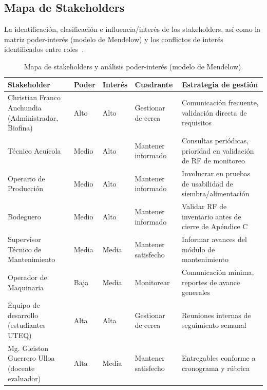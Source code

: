 \documentclass[11pt,a4paper]{article}
\begin{document}
\subsection{Mapa de Stakeholders}
La identificación, clasificación e influencia/interés de los stakeholders, así como la matriz poder-interés (modelo de Mendelow) y los conflictos de interés identificados entre roles~\cite{stakeholder_elicitation_2021}.

\begin{longtable}{|p{4cm}|p{1cm}|p{1.5cm}|p{3cm}|p{5cm}|}
\caption{Mapa de stakeholders y análisis poder-interés (modelo de Mendelow).}
\label{tab:mapa-stakeholders} \\
\hline
\textbf{Stakeholder} & \textbf{Poder} & \textbf{Interés} & \textbf{Cuadrante} & \textbf{Estrategia de gestión} \\
\hline
Christian Franco Anchundia (Administrador, Biofina) & Alto & Alto & Gestionar de cerca & Comunicación frecuente, validación directa de requisitos \\
\hline
Técnico Acuícola & Medio & Alto & Mantener informado & Consultas periódicas, prioridad en validación de RF de monitoreo \\
\hline
Operario de Producción & Medio & Alto & Mantener informado & Involucrar en pruebas de usabilidad de siembra/alimentación \\
\hline
Bodeguero & Medio & Alto & Mantener informado & Validar RF de inventario antes de cierre de Apéndice C \\
\hline
Supervisor Técnico de Mantenimiento & Media & Media & Mantener satisfecho & Informar avances del módulo de mantenimiento \\
\hline
Operador de Maquinaria & Baja & Media & Monitorear & Comunicación mínima, reportes de avance generales \\
\hline
Equipo de desarrollo (estudiantes UTEQ) & Alta & Alta & Gestionar de cerca & Reuniones internas de seguimiento semanal \\
\hline
Mg. Gleiston Guerrero Ulloa (docente evaluador) & Alta & Media & Mantener satisfecho & Entregables conforme a cronograma y rúbrica \\
\hline
\end{longtable}
\end{document}
